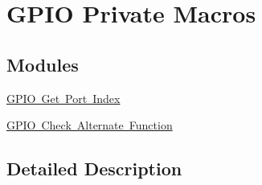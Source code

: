 \hypertarget{group___g_p_i_o_ex___private___macros}{}\section{G\+P\+IO Private Macros}
\label{group___g_p_i_o_ex___private___macros}
\subsection*{Modules}
\begin{DoxyCompactItemize}
\item 
\mbox{\hyperlink{group___g_p_i_o_ex___get___port___index}{G\+P\+I\+O Get Port Index}}
\item 
\mbox{\hyperlink{group___g_p_i_o_ex___i_s___alternat__function__selection}{G\+P\+I\+O Check Alternate Function}}
\end{DoxyCompactItemize}


\subsection{Detailed Description}
